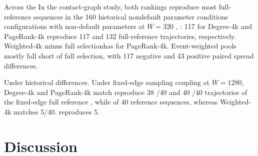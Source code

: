 \documentclass[smallextended]{svjour3}
\providecommand{\DIFaddtex}[1]{{\protect\color{blue} \sf #1}} %
\providecommand{\DIFdeltex}[1]{{\protect\color{red} \scriptsize #1}} %
\providecommand{\DIFaddbegin}{} %
\providecommand{\DIFaddend}{} %
\providecommand{\DIFdelbegin}{} %
\providecommand{\DIFdelend}{} %
\providecommand{\DIFadd}[1]{\texorpdfstring{\DIFaddtex{#1}}{#1}} %
\providecommand{\DIFdel}[1]{\texorpdfstring{\DIFdeltex{#1}}{}} %
\providecommand{\DIFscaledelfig}{0.5}
\newlength{\DIFdelgraphicswidth} %
\newlength{\DIFdelgraphicsheight} %
\providecommand{\DIFaddincludegraphics}[2][]{{\color{blue}\fbox{\DIFOincludegraphics[#1]{#2}}}} %
\providecommand{\DIFdelincludegraphics}[2][]{%
\sbox{\DIFdelgraphicsbox}{\DIFOincludegraphics[#1]{#2}}%
\settoboxwidth{\DIFdelgraphicswidth}{\DIFdelgraphicsbox} %
\settoboxtotalheight{\DIFdelgraphicsheight}{\DIFdelgraphicsbox} %
\scalebox{\DIFscaledelfig}{%
\parbox[b]{\DIFdelgraphicswidth}{\usebox{\DIFdelgraphicsbox}\\[-\baselineskip] \rule{\DIFdelgraphicswidth}{0em}}\llap{\resizebox{\DIFdelgraphicswidth}{\DIFdelgraphicsheight}{%
\setlength{\unitlength}{\DIFdelgraphicswidth}%
\begin{picture}(1,1)%
\thicklines\linethickness{2pt} %
{\color[rgb]{1,0,0}\put(0,0){\framebox(1,1){}}}%
{\color[rgb]{1,0,0}\put(0,0){\line( 1,1){1}}}%
{\color[rgb]{1,0,0}\put(0,1){\line(1,-1){1}}}%
\end{picture}%
}\hspace*{3pt}}} %
} %
\DeclareRobustCommand{\DIFaddbegin}{\DIFOaddbegin \let\includegraphics\DIFaddincludegraphics} %
\DeclareRobustCommand{\DIFaddend}{\DIFOaddend \let\includegraphics\DIFOincludegraphics} %
\DeclareRobustCommand{\DIFdelbegin}{\DIFOdelbegin \let\includegraphics\DIFdelincludegraphics} %
\DeclareRobustCommand{\DIFdelend}{\DIFOaddend \let\includegraphics\DIFOincludegraphics} %
\begin{document}
\DIFdelbegin \DIFdel{Across the }\DIFdelend \DIFaddbegin \DIFadd{In the contact-graph study, both rankings reproduce most full-reference sequences in the }\DIFaddend 160 \DIFdelbegin \DIFdel{historical nondefault parameter conditions }\DIFdelend \DIFaddbegin \DIFadd{configurations with non-default parameters }\DIFaddend at $W=320$\DIFdelbegin \DIFdel{, }\DIFdelend \DIFaddbegin \DIFadd{: 117 for }\DIFaddend Degree-4k and \DIFdelbegin \DIFdel{PageRank-4k reproduce 117 and }\DIFdelend 132 \DIFdelbegin \DIFdel{full-reference trajectories, respectively. Weighted-4k minus full selectionhas }\DIFdelend \DIFaddbegin \DIFadd{for PageRank-4k. Event-weighted pools mostly fall short of full selection, with }\DIFaddend 117 negative and 43 positive paired \DIFdelbegin \DIFdel{spread differences. }%

\DIFdel{Under historical }\DIFdelend \DIFaddbegin \DIFadd{differences. Under }\DIFaddend fixed-edge \DIFdelbegin \DIFdel{sampling }\DIFdelend \DIFaddbegin \DIFadd{coupling }\DIFaddend at $W=1280$, Degree-4k and PageRank-4k \DIFdelbegin \DIFdel{match }\DIFdelend \DIFaddbegin \DIFadd{reproduce }\DIFaddend 38 \DIFdelbegin \DIFdel{/40 }\DIFdelend and 40 \DIFdelbegin \DIFdel{/40 trajectories of the fixed-edge full reference , while }\DIFdelend \DIFaddbegin \DIFadd{of 40 reference sequences, whereas }\DIFaddend Weighted-4k \DIFdelbegin \DIFdel{matches 5/40.
}\DIFdelend \DIFaddbegin \DIFadd{reproduces 5.
}\DIFaddend \FloatBarrier

\section{Discussion}
\end{document}
